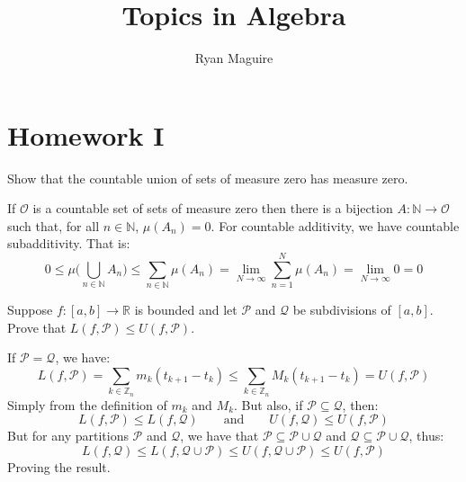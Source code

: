 \documentclass[crop=false,class=article]{standalone}                           %
\begin{document}
    \title{Topics in Algebra}
    \author{Ryan Maguire}
    \date{\vspace{-5ex}}
    \maketitle
    \tableofcontents
    \section{Homework I}
    \begin{problem}
        Show that the countable union of sets of measure zero has measure zero.
    \end{problem}
    \begin{solution}
        If $\mathcal{O}$ is a countable set of sets of measure zero then there
        is a bijection $A:\mathbb{N}\rightarrow\mathcal{O}$ such that, for all
        $n\in\mathbb{N}$, $\mu(A_{n})=0$. For countable additivity, we have
        countable subadditivity. That is:
        \begin{equation}
            0\leq\mu\Big(\bigcup_{n\in\mathbb{N}}A_{n}\Big)
                \leq\sum_{n\in\mathbb{N}}\mu(A_{n})
                =\underset{N\rightarrow\infty}{\lim}\sum_{n=1}^{N}\mu(A_{n})
                =\underset{N\rightarrow\infty}{\lim}0
                =0
        \end{equation}
    \end{solution}
    \begin{problem}
        Suppose $f:[a,b]\rightarrow\mathbb{R}$ is bounded and let $\mathcal{P}$
        and $\mathcal{Q}$ be subdivisions of $[a,b]$. Prove that
        $L(f,\mathcal{P})\leq{U}(f,\mathcal{P})$.
    \end{problem}
    \begin{solution}
        If $\mathcal{P}=\mathcal{Q}$, we have:
        \begin{equation}
                L(f,\mathcal{P})
                =\sum_{k\in\mathbb{Z}_{n}}m_{k}(t_{k+1}-t_{k})
                    \leq\sum_{k\in\mathbb{Z}_{n}}M_{k}(t_{k+1}-t_{k})
                =U(f,\mathcal{P})
        \end{equation}
        Simply from the definition of $m_{k}$ and $M_{k}$. But also, if
        $\mathcal{P}\subseteq\mathcal{Q}$, then:
        \begin{equation}
            L(f,\mathcal{P})\leq{L}(f,\mathcal{Q})
            \quad\quad\textrm{and}\quad\quad
            U(f,\mathcal{Q})\leq{U}(f,\mathcal{P})
        \end{equation}
        But for any partitions $\mathcal{P}$ and $\mathcal{Q}$, we have that
        $\mathcal{P}\subseteq\mathcal{P}\cup\mathcal{Q}$ and
        $\mathcal{Q}\subseteq\mathcal{P}\cup\mathcal{Q}$, thus:
        \begin{equation}
            L(f,\mathcal{Q})\leq{L}(f,\mathcal{Q}\cup\mathcal{P})
                \leq{U}(f,\mathcal{Q}\cup\mathcal{P})\leq{U}(f,\mathcal{P})
        \end{equation}
        Proving the result.
    \end{solution}
\end{document}
